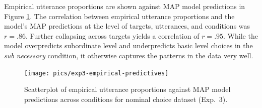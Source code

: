 \documentclass[11pt]{article}
\newcommand{\figref}[1]{Figure \ref{#1}}
\begin{document}
Empirical utterance proportions are shown against MAP model  predictions in \figref{fig:nompredictives}. 
The correlation between empirical utterance proportions and the model's MAP predictions at the level of targets, utterances, and conditions was $r = .86$. Further collapsing across targets yields a correlation of $r = .95$.
While the model overpredicts subordinate	 level  and underpredicts basic level choices in the \emph{sub necessary} condition, it otherwise captures the patterns in the data very well. 


\begin{figure}
\centering
\texttt{[image: pics/exp3-empirical-predictives]}
\caption{Scatterplot of empirical utterance proportions against MAP model predictions across conditions for nominal choice dataset (Exp.~3).}
\label{fig:nompredictives}
\end{figure}




\end{document}
